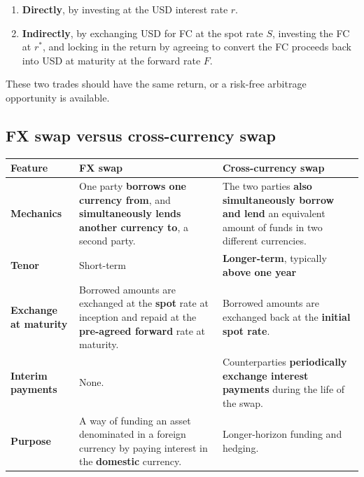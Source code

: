 \begin{lrkeybox}
\begin{enumerate}
\item \textbf{Directly}, by investing at the USD interest rate $r$.
\item \textbf{Indirectly}, by exchanging USD for FC at the spot rate $S$, investing the FC at $r^{*}$, and locking in the return by agreeing to convert the FC proceeds back into USD at maturity at the forward rate $F$.
\end{enumerate}
These two trades should have the same return, or a risk-free arbitrage opportunity is available.
\end{lrkeybox}

\subsection{FX swap versus cross-currency swap}

\begin{center}
\small
\begin{tabularx}{\textwidth}{@{}p{2.5cm} X X@{}}
\toprule
\rowcolor{FRMSoft}\textbf{Feature} & \textbf{FX swap} & \textbf{Cross-currency swap} \\
\midrule
\textbf{Mechanics} &
One party \textbf{borrows one currency from}, and \textbf{simultaneously lends another currency to}, a second party. &
The two parties \textbf{also simultaneously borrow and lend} an equivalent amount of funds in two different currencies. \\
\addlinespace
\textbf{Tenor} & Short-term & \textbf{Longer-term}, typically \textbf{above one year} \\
\addlinespace
\textbf{Exchange at maturity} &
Borrowed amounts are exchanged at the \textbf{spot} rate at inception and repaid at the \textbf{pre-agreed forward} rate at maturity. &
Borrowed amounts are exchanged back at the \textbf{initial spot rate}. \\
\addlinespace
\textbf{Interim payments} & None. & Counterparties \textbf{periodically exchange interest payments} during the life of the swap. \\
\addlinespace
\textbf{Purpose} & A way of funding an asset denominated in a foreign currency by paying interest in the \textbf{domestic} currency. & Longer-horizon funding and hedging. \\
\bottomrule
\end{tabularx}
\end{center}

